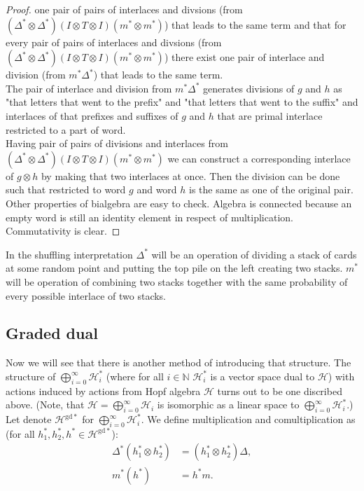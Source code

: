 \documentclass[a4paper, 12pt]{report}
\newcommand{\gdd}[1]{#1^{\mathrm{gd}*}}
\begin{document}
\begin{proof}
one pair of pairs of interlaces and divsions (from $(\Delta^*\otimes \Delta^*)(I \otimes T \otimes I)(m^*
\otimes m^*)$) that leads to the same term and that for every pair of pairs of interlaces and divsions (from
$(\Delta^*\otimes \Delta^*)(I \otimes T \otimes I)(m^*\otimes m^*)$) there exist one pair of interlace and
 division (from
$m^*\Delta^*$) that leads to the same term. \\
The pair of interlace and division from $m^*\Delta^*$ generates divisions of $g$ and $h$ as "that letters
that went to the prefix" and "that letters that went to the suffix" and interlaces of that prefixes and
 suffixes of $g$ and $h$ that are primal interlace restricted to a part of word. \\
Having pair of pairs of divisions and interlaces from $(\Delta^*\otimes \Delta^*)(I \otimes T \otimes I)
(m^*\otimes m^*)$ we can construct a corresponding interlace of $g \otimes h$ by making that two interlaces
at once. Then the division can be done such that restricted to word $g$ and word $h$ is the same as one of
the original pair. \\
Other properties of bialgebra are easy to check.
Algebra is connected because an empty word
is still an identity element in respect of multiplication. Commutativity is clear.
\end{proof}
In the shuffling interpretation $\Delta^*$ will be an operation of dividing a stack of cards at some random
point and putting the top pile on the left creating two stacks. $m^*$ will be operation of combining two
stacks together with the same probability of every possible interlace of two stacks.
\subsection{Graded dual}
Now we will see that there is another method of introducing that structure.
The structure of $\displaystyle\bigoplus^{\infty}_{i = 0} \mathcal{H}_i^*$ (where for all $i \in \mathbb{N}$
$\mathcal{H}_i^*$ is a vector space dual to $\mathcal{H}$) with actions induced by actions
from Hopf algebra $\mathcal{H}$ turns out to be one discribed above. (Note, that $\mathcal{H} =
\displaystyle\bigoplus^{\infty}_{i = 0} \mathcal{H}_i$ is isomorphic as a linear space
to $\displaystyle\bigoplus^{\infty}_{i = 0} \mathcal{H}_i^*$.) \\
\indent Let denote $\gdd{\mathcal{H}}$ for $\displaystyle\bigoplus^{\infty}_{i = 0} \mathcal{H}_i^*$.
We define multiplication
\text{$\Delta^* : \mathcal{H}^{\mathrm{gd}*} \otimes \gdd{\mathcal{H}} \to \gdd{\mathcal{H}}$} and
comultiplication
\text{$m^* : \gdd{\mathcal{H}} \to \gdd{\mathcal{H}} \otimes \gdd{\mathcal{H}}$} as
(for all $h_1^*, h_2^*, h^* \in \gdd{\mathcal{H}}$):
\begin{align*}
\Delta^*(h_1^* \otimes h_2^*) &= (h_1^* \otimes h_2^*)\Delta, \\
m^*(h^*) &= h^*m.
\end{align*}
\end{document}
